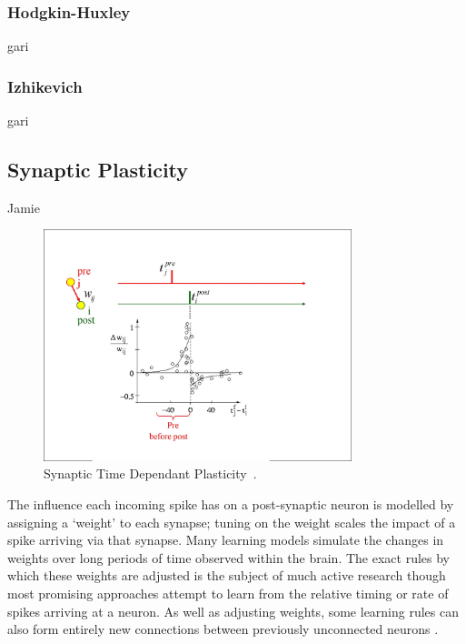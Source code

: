 \subsubsection{Hodgkin-Huxley}
gari

\subsubsection{Izhikevich}
gari

\subsection{Synaptic Plasticity}
Jamie

\begin{figure}[bt]
	\centering
	\includegraphics[width=0.8\textwidth]{pics_snn/fig_stdp_orig.jpg}
	\caption{Synaptic Time Dependant Plasticity~\cite{gerstner2014neuronal}.}
	\label{Fig:STDP}
\end{figure}
The influence each incoming spike has on a post-synaptic neuron is modelled by assigning a `weight' to each synapse;
tuning on the weight scales the impact of a spike
arriving via that synapse.
Many learning models simulate the changes in weights over long periods of time observed within the brain.
The exact rules by which these weights are adjusted is the subject of much active research though most promising approaches attempt to learn from the relative timing \cite{pfister2006triplets} or rate \cite{bienenstock1982theory} of spikes arriving at a neuron.
As well as adjusting weights, some learning rules can also form entirely new connections between previously unconnected
neurons \cite{bamford2010synaptic}.

